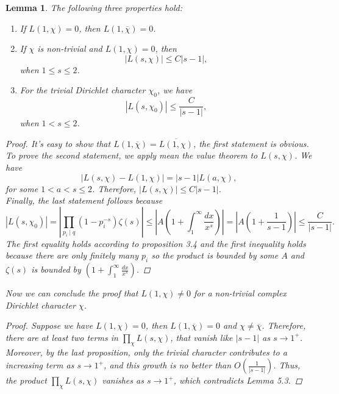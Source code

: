 \documentclass[psamsfonts]{amsart}
\newtheorem{lem}[thm]{Lemma}
\theoremstyle{definition}
\theoremstyle{remark}
\numberwithin{equation}{section}
\begin{document}
			\begin{lem}
				The following three properties hold:
				\begin{enumerate}
					\item If $L(1,\chi) = 0$, then $L(1,\overline{\chi}) = 0$.
					\item If $\chi$ is non-trivial and $L(1,\chi) = 0$, then
						\begin{equation}
							|L(s,\chi)| \leq C|s-1|,
						\end{equation} 
						when $1 \leq s \leq 2$.
					\item For the trivial Dirichlet character $\chi_0$, we have
						\begin{equation}
							|L(s,\chi_0)| \leq \frac{C}{|s-1|},
						\end{equation}
						when $1 < s \leq 2$.
				\end{enumerate}
				
				\begin{proof}
					It's easy to show that $L(1,\overline{\chi}) = \overline{L(1,\chi)}$, the first statement is obvious.
					To prove the second statement, we apply mean the value theorem to $L(s,\chi)$. We have
					\begin{equation}
						|L(s,\chi) - L(1,\chi)| = |s-1|L(a,\chi),
					\end{equation}
					for some $1 < a < s \leq 2$. Therefore, $|L(s,\chi)| \leq C|s-1|$.\\
					Finally, the last statement follows because
					\begin{equation}
						|L(s,\chi_0)| = \left|\prod_{p_i \mid q}(1-p_i^{-s})\zeta(s)\right| \leq \left|A(1+\int_1^{\infty}\frac{dx}{x^s})\right| = \left|A(1+\frac{1}{s-1})\right| \leq \frac{C}{|s-1|}.
					\end{equation}
					The first equality holds according to proposition 3.4 and the first inequality holds because there are only finitely many $p_i$ so the product is bounded by some $A$ and $\zeta(s)$ is bounded by $\left(1+\int_1^{\infty}\frac{dx}{x^s}\right)$.
				\end{proof}
				Now we can conclude the proof that $L(1,\chi) \neq 0$ for a non-trivial complex Dirichlet character $\chi$.
				\begin{proof}
					Suppose we have $L(1,\chi) = 0$, then $L(1,\overline{\chi}) = 0$ and $\chi \neq \overline{\chi}$. Therefore, there are at least two terms in $\prod_{\chi}L(s,\chi)$, that vanish like $|s-1|$ as $s \rightarrow 1^+$. Moreover, by the last proposition, only the trivial character contributes to a increasing term as $s \rightarrow 1^+$, and this growth is no better than $O(\frac{1}{|s-1|})$. Thus, the product $\prod_{\chi}L(s,\chi)$ vanishes as $s \rightarrow 1^+$, which contradicts Lemma 5.3.
				\end{proof}
			\end{lem}		
			
\end{document}

